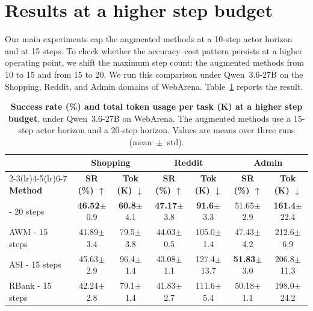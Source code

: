 \section{Results at a higher step budget}
\label{app:step-budget}

Our main experiments cap the augmented methods at a 10-step actor horizon and \budgetactor{} at 15 steps.
To check whether the accuracy--cost pattern persists at a higher operating point, we shift the maximum step count: the augmented methods from 10 to 15 and \budgetactor{} from 15 to 20.
We run this comparison under Qwen~3.6-27B on the Shopping, Reddit, and Admin domains of WebArena.
Table~\ref{tab:step-budget} reports the result.

\begin{table}[ht]
\centering
\small
\begin{tabular}{lcccccc}
\toprule
 & \multicolumn{2}{c}{\textbf{Shopping}} & \multicolumn{2}{c}{\textbf{Reddit}} & \multicolumn{2}{c}{\textbf{Admin}} \\
\cmidrule(lr){2-3}\cmidrule(lr){4-5}\cmidrule(lr){6-7}
\textbf{Method} & \textbf{SR (\%) $\uparrow$} & \textbf{Tok (K) $\downarrow$} & \textbf{SR (\%) $\uparrow$} & \textbf{Tok (K) $\downarrow$} & \textbf{SR (\%) $\uparrow$} & \textbf{Tok (K) $\downarrow$} \\
\midrule
\budgetactor{} - 20 steps & \textbf{46.52}{\scriptsize $\pm$0.9} & \textbf{60.8}{\scriptsize $\pm$4.1} & \textbf{47.17}{\scriptsize $\pm$3.8} & \textbf{91.6}{\scriptsize $\pm$3.3} & 51.65{\scriptsize $\pm$2.9} & \textbf{161.4}{\scriptsize $\pm$22.4} \\
AWM - 15 steps   & 41.89{\scriptsize $\pm$3.4} & 79.5{\scriptsize $\pm$3.8} & 44.03{\scriptsize $\pm$0.5} & 105.0{\scriptsize $\pm$1.4} & 47.43{\scriptsize $\pm$4.2} & 212.6{\scriptsize $\pm$6.9} \\
ASI - 15 steps   & 45.63{\scriptsize $\pm$2.9} & 96.4{\scriptsize $\pm$1.4} & 43.08{\scriptsize $\pm$1.1} & 127.4{\scriptsize $\pm$13.7} & \textbf{51.83}{\scriptsize $\pm$3.0} & 206.8{\scriptsize $\pm$11.3} \\
RBank - 15 steps & 42.24{\scriptsize $\pm$2.8} & 79.1{\scriptsize $\pm$1.4} & 41.83{\scriptsize $\pm$2.7} & 111.6{\scriptsize $\pm$5.4} & 50.18{\scriptsize $\pm$1.1} & 198.0{\scriptsize $\pm$24.2} \\
\bottomrule
\end{tabular}
\caption{\textbf{Success rate (\%) and total token usage per task (K) at a higher step budget}, under Qwen~3.6-27B on WebArena. The augmented methods use a 15-step actor horizon and \budgetactor{} a 20-step horizon. Values are means over three runs (mean~$\pm$~{\scriptsize std}).}
\label{tab:step-budget}
\end{table}

